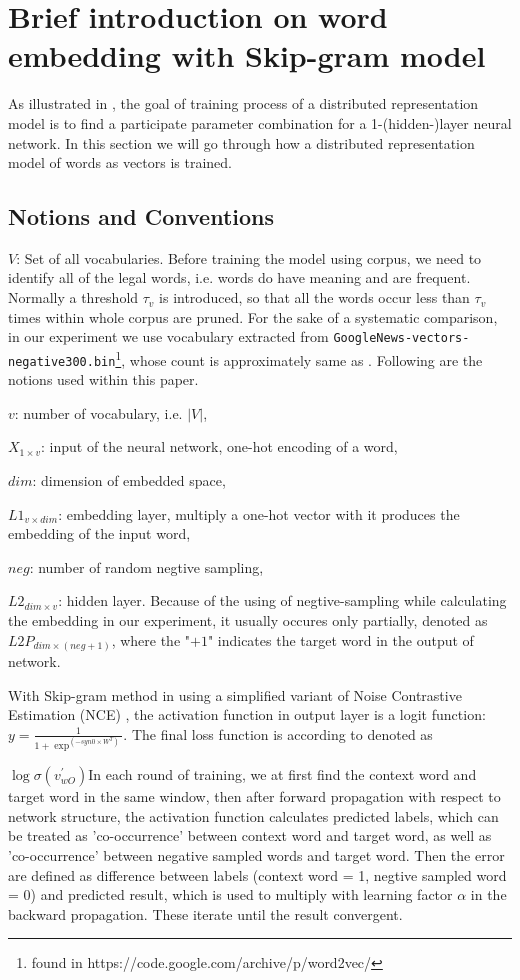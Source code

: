 \section{Brief introduction on word embedding with Skip-gram model}
As illustrated in \cite{mikolov2013distributed}, the goal of training process of a distributed representation model is to find a participate parameter combination for a 1-(hidden-)layer neural network. In this section we will go through how a distributed representation model of words as vectors is trained.

  \subsection{Notions and Conventions}
  $V$: Set of all vocabularies. Before training the model using corpus, we need to identify all of the legal words, i.e. words do have meaning and are frequent. Normally a threshold $\tau_v$ is introduced, so that all the words occur less than $\tau_v$ times within whole corpus are pruned. For the sake of a systematic comparison, in our experiment we use vocabulary extracted from \verb|GoogleNews-vectors-negative300.bin|\footnote{found in https://code.google.com/archive/p/word2vec/}, whose count is approximately same as \cite{levy2015improving}. Following are the notions used within this paper.

  $v$: number of vocabulary, i.e. $|V|$,

  $X_{1 \times v}$: input of the neural network, one-hot encoding of a word,

  $dim$: dimension of embedded space,

  $L1_{v \times dim}$: embedding layer, multiply a one-hot vector with it produces the embedding of the input word,

  $neg$: number of random negtive sampling,

  $L2_{dim \times v}$: hidden layer. Because of the using of negtive-sampling while calculating the embedding in our experiment, it usually occures only partially, denoted as $L2P_{dim \times (neg+1)}$, where the "$+1$" indicates the target word in the output of network.

  With Skip-gram method in \cite{mikolov2013distributed} using a simplified variant of Noise Contrastive Estimation (NCE) \cite{gutmann2012noise}, the activation function in output layer is a logit function: $y=\frac{1}{1+\exp ^{(-syn0\times W^T)}}$. The final loss function is according to \cite{mikolov2013distributed} denoted as 

  $\log{\sigma(v^\prime_{wO})}$In each round of training, we at first find the context word and target word in the same window, then after forward propagation with respect to network structure, the activation function calculates predicted labels, which can be treated as 'co-occurrence' between context word and target word, as well as 'co-occurrence' between negative sampled words and target word. Then the error are defined as difference between labels (context word = 1, negtive sampled word = 0) and predicted result, which is used to multiply with learning factor $\alpha$ in the backward propagation. These iterate until the result convergent.
